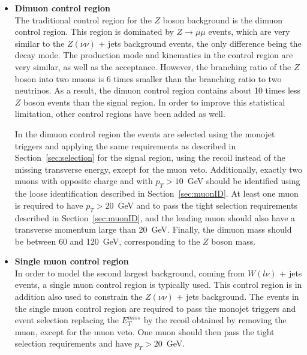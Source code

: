 \begin{itemize}
 \item[] \textbf{Dimuon control region}\\ The traditional control region for the $Z$ boson background is the dimuon control region. This region is dominated by $Z\rightarrow\mu\mu$ events, which are very similar to the $Z(\nu\nu)$ + jets background events, the only difference being the decay mode. The production mode and kinematics in the control region are very similar, as well as the acceptance. However, the branching ratio of the $Z$ boson into two muons is 6 times smaller than the branching ratio to two neutrinos. As a result, the dimuon control region contains about 10 times less $Z$ boson events than the signal region. In order to improve this statistical limitation, other control regions have been added as well.

In the dimuon control region the events are selected using the monojet triggers and applying the same requirements as described in Section~\ref{sec:selection} for the signal region, using the recoil instead of the missing transverse energy, except for the muon veto. Additionally, exactly two muons with opposite charge and with $p_T > 10$~GeV should be identified using the loose identification described in Section~\ref{sec:muonID}. At least one muon is required to have $p_T > 20$~GeV and to pass the tight selection requirements described in Section~\ref{sec:muonID}, and the leading muon should also have a transverse momentum large than 20~GeV. Finally, the dimuon mass should be between 60 and 120~GeV, corresponding to the $Z$ boson mass.

\item[] \textbf{Single muon control region}\\ In order to model the second largest background, coming from $W(l\nu)$ + jets events, a single muon control region is typically used. This control region is in addition also used to constrain the $Z(\nu\nu)$ + jets background. The events in the single muon control region are required to pass the monojet triggers and event selection replacing the $E_T^{miss}$ by the recoil obtained by removing the muon, except for the muon veto. One muon should then pass the tight selection requirements and have $p_T > 20$~GeV.


\end{itemize}
